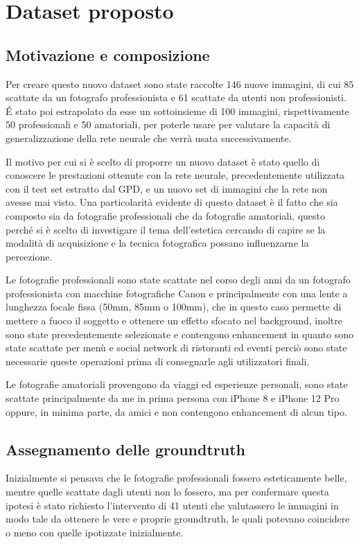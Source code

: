 \chapter{Dataset proposto}
\label{new_dataset}
\section{Motivazione e composizione}
Per creare questo nuovo dataset sono state raccolte 146 nuove immagini, di cui 85 scattate da un fotografo professionista e 61 scattate da utenti non professionisti. É stato poi estrapolato da esse un sottoinsieme di 100 immagini, rispettivamente 50 professionali e 50 amatoriali, per poterle usare per valutare la capacità di generalizzazione della rete neurale che verrà usata successivamente.

Il motivo per cui si è scelto di proporre un nuovo dataset è stato quello di conoscere le prestazioni ottenute con la rete neurale, precedentemente utilizzata con il test set estratto dal GPD, e un nuovo set di immagini che la rete non avesse mai visto. Una particolarità evidente di questo dataset è il fatto che sia composto sia da fotografie professionali che da fotografie amatoriali, questo perché si è scelto di investigare il tema dell'estetica cercando di capire se la modalità di acquisizione e la tecnica fotografica possano influenzarne la percezione.

Le fotografie professionali sono state scattate nel corso degli anni da un fotografo professionista con macchine fotografiche Canon e principalmente con una lente a lunghezza focale fissa (50mm, 85mm o 100mm), che in questo caso permette di mettere a fuoco il soggetto e ottenere un effetto sfocato nel background, inoltre sono state precedentemente selezionate e contengono enhancement in quanto sono state scattate per menù e social network di ristoranti ed eventi perciò sono state necessarie queste operazioni prima di consegnarle agli utilizzatori finali.

Le fotografie amatoriali provengono da viaggi ed esperienze personali, sono state scattate principalmente da me in prima persona con iPhone 8 e iPhone 12 Pro oppure, in minima parte, da amici e non contengono enhancement di alcun tipo.

\section{Assegnamento delle groundtruth}
Inizialmente si pensava che le fotografie professionali fossero esteticamente belle, mentre quelle scattate dagli utenti non lo fossero, ma per confermare questa ipotesi è stato richiesto l'intervento di 41 utenti che valutassero le immagini in modo tale da ottenere le vere e proprie groundtruth, le quali potevano coincidere o meno con quelle ipotizzate inizialmente.

